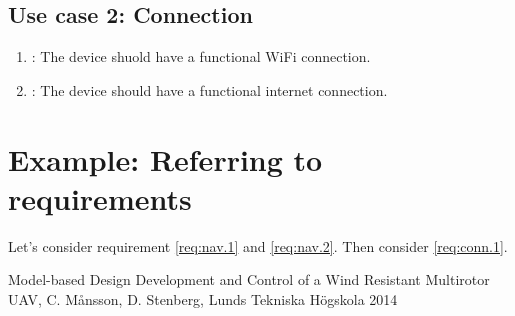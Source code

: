 \documentclass[a4paper]{article}
\makeatletter
\newcommand{\labitem}[2]{%
\def\@itemlabel{\textbf{#2}}
\item
\def\@currentlabel{#2}\label{#1}}
\makeatother
\begin{document}
\subsection{Use case 2: Connection}

\setlength{\parindent}{3cm}

\begin{enumerate}
\labitem{req:conn.1}{Connection.1}: The device shuold have a functional WiFi connection.
\labitem{req:conn.2}{Connection.2}: The device should have a functional internet connection.
\end{enumerate}

\section{Example: Referring to requirements}
Let's consider requirement \ref{req:nav.1} and \ref{req:nav.2}. Then consider \ref{req:conn.1}.


\begin{thebibliography}{99}
 Model-based Design Development and Control of a Wind Resistant Multirotor UAV, C. Månsson, D. Stenberg, Lunds Tekniska Högskola 2014
\end{thebibliography}
\end{document}
